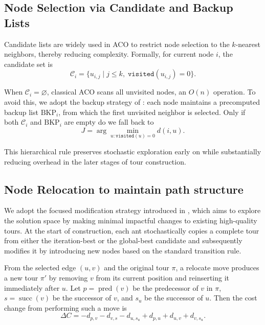 \documentclass[a4paper,conference]{IEEEtran}
\newcommand{\calC}{\mathcal{C}}
\begin{document}
\subsection{Node Selection via Candidate and Backup Lists}
Candidate lists are widely used in ACO to restrict node selection to the $k$-nearest neighbors, thereby reducing complexity. Formally, for current node $i$, the candidate set is
\begin{equation}
\calC_i = \{u_{i,j} \mid j\le k,\; \texttt{visited}(u_{i,j})=0\}.
\end{equation}

When $\calC_i=\varnothing$, classical ACO scans all unvisited nodes, an $O(n)$ operation. To avoid this, we adopt the backup strategy of \cite{ACOTSP-MF}: each node maintains a precomputed backup list $\text{BKP}_i$, from which the first unvisited neighbor is selected. Only if both $\calC_i$ and $\text{BKP}_i$ are empty do we fall back to
\begin{equation}
J = \arg\min_{u:\texttt{visited}(u)=0} d(i,u).
\end{equation}

This hierarchical rule preserves stochastic exploration early on while substantially reducing overhead in the later stages of tour construction.

\subsection{Node Relocation to maintain path structure}
We adopt the focused modification strategy introduced in \cite{FACO2023}, which aims to explore the solution space by making minimal impactful changes to existing high-quality tours. At the start of construction, each ant stochastically copies a complete tour from either the iteration-best or the global-best candidate and subsequently modifies it by introducing new nodes based on the standard transition rule.

From the selected edge $(u,v)$ and the original tour $\pi$, a relocate move produces a new tour $\pi'$ by removing $v$ from its current position and reinserting it immediately after $u$. Let $p=\operatorname{pred}(v)$ be the predecessor of $v$ in $\pi$, $s=\operatorname{succ}(v)$ be the successor of $v$, and $s_u$ be the successor of $u$. Then the cost change from performing such a move is
\begin{equation}
\Delta C = -d_{p,v} - d_{v,s} - d_{u,s_u} + d_{p,u} + d_{u,v} + d_{v,s_u}.
\end{equation}
\end{document}
